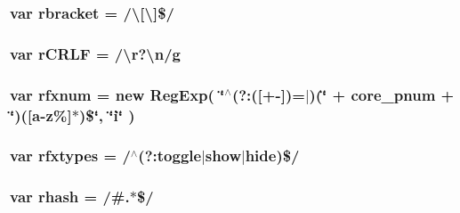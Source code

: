 \hypertarget{jquery-1_89_81_8js_a07117e28ee58d2d2664cfbaf741e10c1}{
\subsubsection[{rbracket}]{\setlength{\rightskip}{0pt plus 5cm}var rbracket = /\textbackslash{}\mbox{[}\textbackslash{}\mbox{]}\$/}}\label{jquery-1_89_81_8js_a07117e28ee58d2d2664cfbaf741e10c1}
\hypertarget{jquery-1_89_81_8js_a4fd9dfc4eb645b441a3e84730c50154b}{
\subsubsection[{r\+C\+R\+L\+F}]{\setlength{\rightskip}{0pt plus 5cm}var r\+C\+R\+L\+F = /\textbackslash{}{\bf r}?\textbackslash{}{\bf n}/{\bf g}}}\label{jquery-1_89_81_8js_a4fd9dfc4eb645b441a3e84730c50154b}
\hypertarget{jquery-1_89_81_8js_a7907e208847275b29993c85031275f9f}{
\subsubsection[{rfxnum}]{\setlength{\rightskip}{0pt plus 5cm}var rfxnum = new Reg\+Exp( \char`\"{}$^\wedge$(?\+:(\mbox{[}+-\/\mbox{]})=$\vert$)(\char`\"{} + core\+\_\+pnum + \char`\"{})(\mbox{[}a-\/z\%\mbox{]}$\ast$)\$\char`\"{}, \char`\"{}{\bf i}\char`\"{} )}}\label{jquery-1_89_81_8js_a7907e208847275b29993c85031275f9f}
\hypertarget{jquery-1_89_81_8js_a28b1e14ecaade6675453a292b2c1dba6}{
\subsubsection[{rfxtypes}]{\setlength{\rightskip}{0pt plus 5cm}var rfxtypes = /$^\wedge$(?\+:toggle$\vert${\bf show}$\vert${\bf hide})\$/}}\label{jquery-1_89_81_8js_a28b1e14ecaade6675453a292b2c1dba6}
\hypertarget{jquery-1_89_81_8js_a6990b6955b6bec9dd39f3814cfb56d6d}{
\subsubsection[{rhash}]{\setlength{\rightskip}{0pt plus 5cm}var rhash = /\#.$\ast$\$/}}\label{jquery-1_89_81_8js_a6990b6955b6bec9dd39f3814cfb56d6d}

